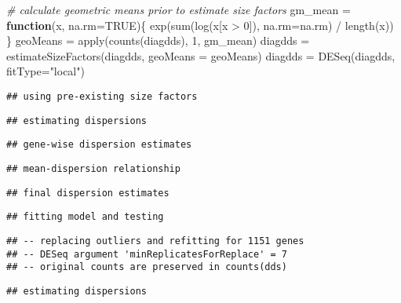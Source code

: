 \documentclass[
]{article}
\newenvironment{Shaded}{\begin{snugshade}}{\end{snugshade}}
\newcommand{\AttributeTok}[1]{\textcolor[rgb]{0.77,0.63,0.00}{#1}}
\newcommand{\CommentTok}[1]{\textcolor[rgb]{0.56,0.35,0.01}{\textit{#1}}}
\newcommand{\ConstantTok}[1]{\textcolor[rgb]{0.00,0.00,0.00}{#1}}
\newcommand{\ControlFlowTok}[1]{\textcolor[rgb]{0.13,0.29,0.53}{\textbf{#1}}}
\newcommand{\DecValTok}[1]{\textcolor[rgb]{0.00,0.00,0.81}{#1}}
\newcommand{\FunctionTok}[1]{\textcolor[rgb]{0.00,0.00,0.00}{#1}}
\newcommand{\NormalTok}[1]{#1}
\newcommand{\OtherTok}[1]{\textcolor[rgb]{0.56,0.35,0.01}{#1}}
\newcommand{\SpecialCharTok}[1]{\textcolor[rgb]{0.00,0.00,0.00}{#1}}
\newcommand{\StringTok}[1]{\textcolor[rgb]{0.31,0.60,0.02}{#1}}
\begin{document}
\begin{Shaded}
\begin{Highlighting}[]
\CommentTok{\# calculate geometric means prior to estimate size factors}
\NormalTok{gm\_mean }\OtherTok{=} \ControlFlowTok{function}\NormalTok{(x, }\AttributeTok{na.rm=}\ConstantTok{TRUE}\NormalTok{)\{}
  \FunctionTok{exp}\NormalTok{(}\FunctionTok{sum}\NormalTok{(}\FunctionTok{log}\NormalTok{(x[x }\SpecialCharTok{\textgreater{}} \DecValTok{0}\NormalTok{]), }\AttributeTok{na.rm=}\NormalTok{na.rm) }\SpecialCharTok{/} \FunctionTok{length}\NormalTok{(x))}
\NormalTok{\}}
\NormalTok{geoMeans }\OtherTok{=} \FunctionTok{apply}\NormalTok{(}\FunctionTok{counts}\NormalTok{(diagdds), }\DecValTok{1}\NormalTok{, gm\_mean)}
\NormalTok{diagdds }\OtherTok{=} \FunctionTok{estimateSizeFactors}\NormalTok{(diagdds, }\AttributeTok{geoMeans =}\NormalTok{ geoMeans)}
\NormalTok{diagdds }\OtherTok{=} \FunctionTok{DESeq}\NormalTok{(diagdds, }\AttributeTok{fitType=}\StringTok{"local"}\NormalTok{)}
\end{Highlighting}
\end{Shaded}

\begin{verbatim}
## using pre-existing size factors
\end{verbatim}

\begin{verbatim}
## estimating dispersions
\end{verbatim}

\begin{verbatim}
## gene-wise dispersion estimates
\end{verbatim}

\begin{verbatim}
## mean-dispersion relationship
\end{verbatim}

\begin{verbatim}
## final dispersion estimates
\end{verbatim}

\begin{verbatim}
## fitting model and testing
\end{verbatim}

\begin{verbatim}
## -- replacing outliers and refitting for 1151 genes
## -- DESeq argument 'minReplicatesForReplace' = 7 
## -- original counts are preserved in counts(dds)
\end{verbatim}

\begin{verbatim}
## estimating dispersions
\end{verbatim}
\end{document}
